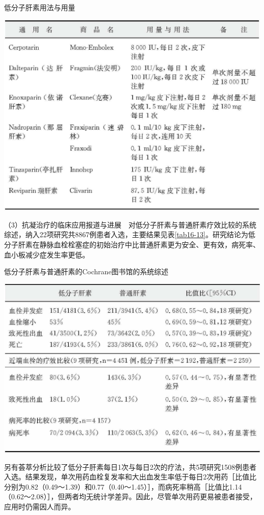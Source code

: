 \begin{table}[htbp]
\centering
\caption{低分子肝素用法与用量}
\label{tab16-12}
\includegraphics{./images/Image00133.jpg}
\end{table}

（3）抗凝治疗的临床应用报道与进展　对低分子肝素与普通肝素疗效比较的系统综述，纳入22项研究共8867例患者入选，主要结果见表\ref{tab16-13}。研究结论为低分子肝素在静脉血栓栓塞症的初始治疗中比普通肝素更为安全、更有效，病死率、血小板减少症发生率更低。

\begin{table}[htbp]
\centering
\caption{低分子肝素与普通肝素的Cochrane图书馆的系统综述}
\label{tab16-13}
\includegraphics{./images/Image00134.jpg}
\end{table}

另有荟萃分析比较了低分子肝素每日1次与每日2次的疗法，共5项研究1508例患者入选。结果发现，单次用药血栓复发率和大出血发生率低于每日2次用药［比值比分别为0.82（0.49～1.39）和0.77（0.40～1.45）］，而病死率稍高［比值比1.14（0.62～2.08）］，但两者均无统计学差异。因此，尽管单次用药更易被患者接受，应用时仍需因人而异。

